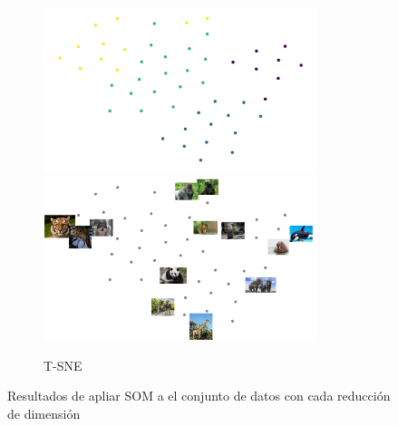 \begin{figure}[H]
    \begin{subfigure}{17cm}
        \centering
        \includegraphics[width=8cm]{Graphics/SOM_TSNE.png}
        \includegraphics[width=8cm]{Graphics/TSNE.png}
        \caption{T-SNE}
    \end{subfigure}
    \caption{Resultados de apliar SOM a el conjunto de datos con cada reducción de dimensión}
    \label{fig:som}
\end{figure}

